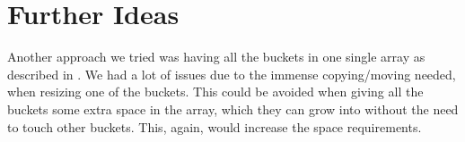 \documentclass{article}
\begin{document}
\section{Further Ideas}

Another approach we tried was having all the buckets in one single array as
described in \cite[p. 94]{mesa08}. We had a lot of issues due to the immense
copying/moving needed, when resizing one of the buckets. This could be avoided
when giving all the buckets some extra space in the array, which they can grow
into without the need to touch other buckets. This, again, would increase the
space requirements.



\printbibliography
\end{document}
